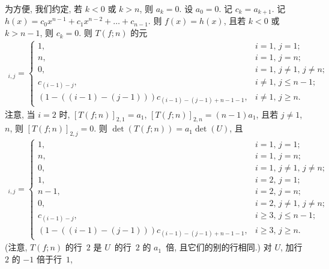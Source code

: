 \documentclass[../libro.tex]{subfiles}
\begin{document}
\begin{example}
    为方便, 我们约定, 若 \(k < 0\) 或 \(k > n\),
    则 \(a_k = 0\).
    设 \(a_0 = 0\).
    记 \(c_k = a_{k+1}\).
    记 \(h(x) = c_0 x^{n-1} + c_1 x^{n-2} + \dots + c_{n-1}\).
    则 \(f(x) = h(x)\),
    且若 \(k < 0\) 或 \(k > n - 1\),
    则 \(c_k = 0\).
    则 \(T(f; n)\) 的元
    \begin{align*}
        [T(f; n)]_{i,j} =
        \begin{cases}
            1,
            & \text{\(i = 1\), \(j = 1\)}; \\
            n,
            & \text{\(i = 1\), \(j = n\)}; \\
            0,
            & \text{\(i = 1\), \(j \neq 1\), \(j \neq n\)}; \\
            c_{(i-1)-j},
            & \text{\(i \neq 1\), \(j \leq n-1\)}; \\
            (1 - ((i-1) - (j-1))) c_{(i-1)-(j-1)+n-1-1},
            & \text{\(i \neq 1\), \(j \geq n\)}.
        \end{cases}
    \end{align*}
    注意, 当 \(i = 2\) 时,
    \([T(f; n)]_{2,1} = a_1\),
    \([T(f; n)]_{2,n} = (n-1) a_1\),
    且若 \(j \neq 1\), \(n\),
    则 \([T(f; n)]_{2,j} = 0\).
    则 \(\det {(T(f; n))} = a_1 \det {(U)}\),
    且
    \begin{align*}
        [U]_{i,j} =
        \begin{cases}
            1,
            & \text{\(i = 1\), \(j = 1\)}; \\
            n,
            & \text{\(i = 1\), \(j = n\)}; \\
            0,
            & \text{\(i = 1\), \(j \neq 1\), \(j \neq n\)}; \\
            1,
            & \text{\(i = 2\), \(j = 1\)}; \\
            n-1,
            & \text{\(i = 2\), \(j = n\)}; \\
            0,
            & \text{\(i = 2\), \(j \neq 1\), \(j \neq n\)}; \\
            c_{(i-1)-j},
            & \text{\(i \geq 3\), \(j \leq n-1\)}; \\
            (1 - ((i-1) - (j-1))) c_{(i-1)-(j-1)+n-1-1},
            & \text{\(i \geq 3\), \(j \geq n\)}.
        \end{cases}
    \end{align*}
    (注意, \(T(f; n)\) 的行~\(2\) 是 %
    \(U\)~的行~\(2\) 的 \(a_1\)~倍,
    且它们的别的行相同.) %
    对 \(U\), 加行~\(2\) 的 \(-1\) 倍于行~\(1\),

\end{example}
\end{document}
